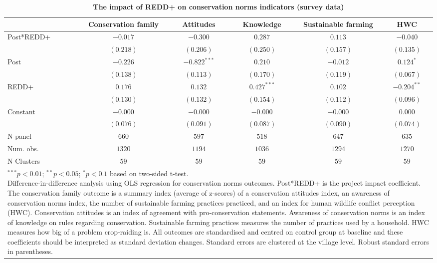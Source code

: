 \documentclass[
]{article}
\begin{document}
\begin{table}[h]
\caption{\textbf{The impact of REDD+ on conservation norms indicators (survey data)}}
\begin{center}
\begin{tabular}{l c c c c c}
\hline
 & Conservation family & Attitudes & Knowledge & Sustainable farming & HWC \\
\hline
Post*REDD+ & $-0.017$  & $-0.300$       & $0.287$       & $0.113$   & $-0.040$      \\
           & $(0.218)$ & $(0.206)$      & $(0.250)$     & $(0.157)$ & $(0.135)$     \\
Post       & $-0.226$  & $-0.822^{***}$ & $0.210$       & $-0.012$  & $0.124^{*}$   \\
           & $(0.138)$ & $(0.113)$      & $(0.170)$     & $(0.119)$ & $(0.067)$     \\
REDD+      & $0.176$   & $0.132$        & $0.427^{***}$ & $0.102$   & $-0.204^{**}$ \\
           & $(0.130)$ & $(0.132)$      & $(0.154)$     & $(0.112)$ & $(0.096)$     \\
Constant   & $-0.000$  & $-0.000$       & $-0.000$      & $-0.000$  & $0.000$       \\
           & $(0.076)$ & $(0.091)$      & $(0.087)$     & $(0.090)$ & $(0.074)$     \\
\hline
N panel    & $660$     & $597$          & $518$         & $647$     & $635$         \\
Num. obs.  & $1320$    & $1194$         & $1036$        & $1294$    & $1270$        \\
N Clusters & $59$      & $59$           & $59$          & $59$      & $59$          \\
\hline
\multicolumn{6}{l}{\scriptsize{\parbox{.9\linewidth}{\vspace{2pt}$^{***}p<0.01$; $^{**}p<0.05$; $^{*}p<0.1$ based on two-sided t-test.\\
       Difference-in-difference analysis using OLS regression for conservation norms outcomes. Post*REDD+ is the project impact coefficient. The conservation family outcome is a summary index (average of z-scores) of a conservation attitudes index, an awareness of conservation norms index, the number of sustainable farming practices practiced, and an index for human wildlife conflict perception (HWC). Conservation attitudes is an index of agreement with pro-conservation statements. Awareness of conservation norms is an index of knowledge on rules regarding conservation. Sustainable farming practices measures the number of practices used by a household. HWC measures how big of a problem crop-raiding is. All outcomes are standardised and centred on control group at baseline and these coefficients should be interpreted as standard deviation changes. Standard errors are clustered at the village level. Robust standard errors in parentheses.}}}
\end{tabular}
\label{table:coefficients}
\end{center}
\end{table}
\end{document}
